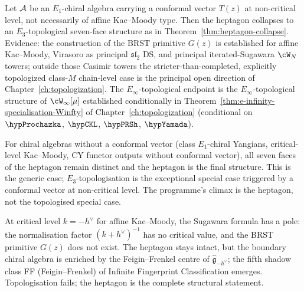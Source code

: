 \begin{conjecture}
\label{conj:heptagon-collapse-general}%
Let $\mathcal{A}$ be an $E_1$-chiral algebra carrying a conformal vector
$T(z)$ at non-critical level, not necessarily of affine Kac--Moody
type. Then the heptagon collapses to an $E_3$-topological
seven-face structure as in Theorem~\ref{thm:heptagon-collapse}.
Evidence: the construction of the BRST primitive $G(z)$ is established
for affine Kac--Moody, Virasoro as principal $\mathfrak{sl}_2$ DS, and
principal iterated-Sugawara $\cW_N$ towers; outside those Casimir
towers the stricter-than-completed, explicitly topologized
class-$M$ chain-level case is the principal open direction of
Chapter~\ref{ch:topologization}. The
$E_\infty$-topological endpoint is the $E_\infty$-topological structure of
$\cW_\infty[\mu]$ established conditionally in
Theorem~\ref{thm:e-infinity-specialisation-Winfty} of
Chapter~\ref{ch:topologization} (conditional on
$\hypProchazka$, $\hypCKL$, $\hypPRSh$, $\hypYamada$).
\end{conjecture}

\begin{remark}
\label{rem:heptagon-survives-generic}
For chiral algebras without a conformal vector (class $E_1$-chiral
Yangians, critical-level Kac--Moody, CY functor outputs without
conformal vector), all seven faces of the heptagon remain distinct
and the heptagon is the final structure. This is the generic case;
$E_3$-topologisation is the exceptional special case triggered by a
conformal vector at non-critical level. The programme's climax is
the heptagon, not the topologised special case.
\end{remark}

\begin{remark}\label{rem:heptagon-critical}
At critical level $k=-h^{\vee}$ for affine Kac--Moody, the Sugawara
formula has a pole: the normalisation factor
$(k+h^{\vee})^{-1}$ has no critical value, and the BRST primitive
$G(z)$ does not exist. The heptagon stays intact, but the boundary chiral algebra
is enriched by the Feigin--Frenkel centre of
$\hat{\mathfrak{g}}_{-h^{\vee}}$; the fifth shadow class FF
(Feigin--Frenkel) of Infinite Fingerprint Classification emerges.
Topologisation fails; the heptagon is the complete structural
statement.
\end{remark}

